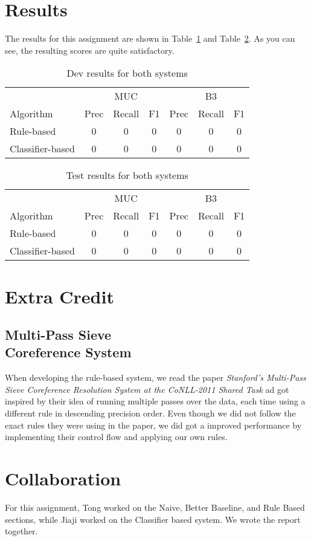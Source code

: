 \documentclass[12pt, twocolumn]{article}
\begin{document}
\section{Results}
The results for this assignment are shown in Table~\ref{tab:devresults} and Table~\ref{tab:testresults}. As you can see, the resulting scores are quite satisfactory.
\begin{table}[H]
\begin{minipage}{\textwidth}
\centering
\begin{tabular}{l|c c c|c c c}
\hline
& & MUC & & & B3 & \\
Algorithm & Prec & Recall & F1 & Prec & Recall & F1 \\\hline
Rule-based & 0 & 0 & 0 & 0 & 0 & 0\\\hline  
Classifier-based & 0 & 0 & 0 & 0 & 0 & 0\\\hline
\end{tabular}
\caption{Dev results for both systems}\label{tab:devresults}
\end{minipage}
\end{table}
\begin{table}[H]
\begin{minipage}{\textwidth}
\centering
\begin{tabular}{l|c c c|c c c}
\hline
& & MUC & & & B3 & \\
Algorithm & Prec & Recall & F1 & Prec & Recall & F1 \\\hline
Rule-based & 0 & 0 & 0 & 0 & 0 & 0\\\hline  
Classifier-based & 0 & 0 & 0 & 0 & 0 & 0\\\hline
\end{tabular}
\caption{Test results for both systems}\label{tab:testresults}
\end{minipage}
\end{table}


\section{Extra Credit}
\subsection{Multi-Pass Sieve \\Coreference System}
When developing the rule-based system, we read the paper 
\textit{Stanford’s Multi-Pass Sieve Coreference Resolution System at the CoNLL-2011 Shared Task} ad got inspired by their idea of running multiple passes over the data, each time using a different rule in descending precision order. Even though we did not follow the exact rules they were using in the paper, we did got a improved performance by implementing their control flow and applying our own rules.


\section{Collaboration} 
For this assignment, Tong worked on the Naive, Better Baseline, and Rule Based sections, while Jiaji worked on the Classifier based system. We wrote the report together.
\end{document}
